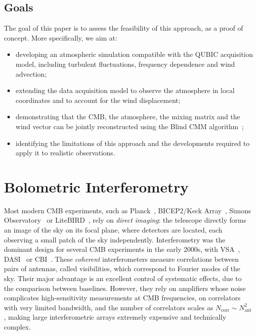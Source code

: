 \documentclass[a4paper,11pt]{article}
\begin{document}
\subsection{Goals}
\label{sec:goals}

The goal of this paper is to assess the feasibility of this approach, as a proof of concept. More specifically, we aim at:
\begin{itemize}
    \item developing an atmospheric simulation compatible with the QUBIC acquisition model, including turbulent fluctuations, frequency dependence and wind advection;
    \item extending the data acquisition model to observe the atmosphere in local coordinates and to account for the wind displacement;
    \item demonstrating that the CMB, the atmosphere, the mixing matrix and the wind vector can be jointly reconstructed using the Blind CMM algorithm~\cite{cmm};
    \item identifying the limitations of this approach and the developments required to apply it to realistic observations.
\end{itemize}

\section{Bolometric Interferometry}
\label{sec:bi}

Most modern CMB experiments, such as Planck~\cite{PlanckDesign}, BICEP2/Keck Array~\cite{BicepDesign}, Simons Observatory~\cite{SODesign} or LiteBIRD~\cite{LiteBirdDesign}, rely on \emph{direct imaging}: the telescope directly forms an image of the sky on its focal plane, where detectors are located, each observing a small patch of the sky independently. Interferometry was the dominant design for several CMB experiments in the early 2000s, with VSA~\cite{VSA}, DASI~\cite{DASI} or CBI~\cite{CBI}. These \emph{coherent} interferometers measure correlations between pairs of antennas, called visibilities, which correspond to Fourier modes of the sky. Their major advantage is an excellent control of systematic effects, due to the comparison between baselines. However, they rely on amplifiers whose noise complicates high-sensitivity measurements at CMB frequencies, on correlators with very limited bandwidth, and the number of correlators scales as $N_{\mathrm{corr}} \sim N_{\mathrm{ant}}^2$, making large interferometric arrays extremely expensive and technically complex.
\end{document}
